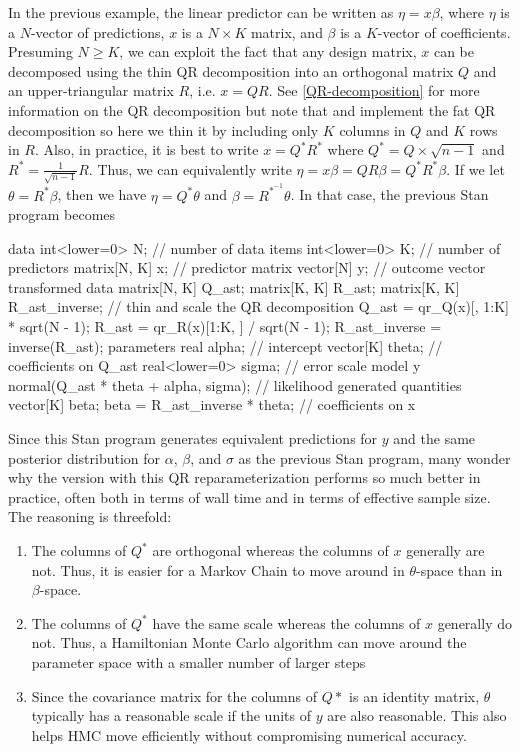 In the previous example, the linear predictor can be written as
$\eta = x \beta$, where $\eta$ is a $N$-vector of predictions, 
$x$ is a $N \times K$ matrix, and $\beta$ is a $K$-vector of coefficients.
Presuming $N \geq K$, we can exploit the fact that any design matrix, $x$
can be decomposed using the thin QR decomposition into an orthogonal matrix
$Q$ and an upper-triangular matrix $R$, i.e. $x = Q R$. See \ref{QR-decomposition}
for more information on the QR decomposition but note that  and 
 implement the fat QR decomposition so here we thin it by including
only $K$ columns in $Q$ and $K$ rows in $R$. Also, in practice, it is best to
write $x = Q^\ast R^\ast$ where $Q^\ast = Q \times \sqrt{n - 1}$ and 
$R^\ast = \frac{1}{\sqrt{n - 1}} R$. Thus, we can equivalently write 
$\eta = x \beta = Q R \beta = Q^\ast R^\ast \beta$. If we let 
$\theta = R^\ast \beta$, then we have $\eta = Q^\ast \theta$ and 
$\beta = R^{\ast^{-1}} \theta$. In that case, the previous Stan program becomes
%
\begin{stancode}
data {
  int<lower=0> N;   // number of data items
  int<lower=0> K;   // number of predictors
  matrix[N, K] x;   // predictor matrix
  vector[N] y;      // outcome vector
}
transformed data {
  matrix[N, K] Q_ast;
  matrix[K, K] R_ast;
  matrix[K, K] R_ast_inverse;
  // thin and scale the QR decomposition
  Q_ast = qr_Q(x)[, 1:K] * sqrt(N - 1);
  R_ast = qr_R(x)[1:K, ] / sqrt(N - 1);
  R_ast_inverse = inverse(R_ast);
}
parameters {
  real alpha;           // intercept
  vector[K] theta;      // coefficients on Q_ast
  real<lower=0> sigma;  // error scale
}
model {
  y ~ normal(Q_ast * theta + alpha, sigma);  // likelihood
}
generated quantities {
  vector[K] beta;
  beta = R_ast_inverse * theta; // coefficients on x
}
\end{stancode}
%
Since this Stan program generates equivalent predictions for $y$ and
the same posterior distribution for $\alpha$, $\beta$, and $\sigma$ as
the previous Stan program, many wonder why the version with this QR
reparameterization performs so much better in practice, often both in
terms of wall time and in terms of effective sample size. The
reasoning is threefold:
%
\begin{enumerate}
\item The columns of $Q^\ast$ are orthogonal whereas the columns of
  $x$ generally are not. Thus, it is easier for a Markov Chain to move
  around in $\theta$-space than in $\beta$-space.
\item The columns of $Q^\ast$ have the same scale whereas the columns
  of $x$ generally do not. Thus, a Hamiltonian Monte Carlo algorithm
  can move around the parameter space with a smaller number of larger
  steps
\item Since the covariance matrix for the columns of $Q\ast$ is an
  identity matrix, $\theta$ typically has a reasonable scale if the
  units of $y$ are also reasonable. This also helps HMC move
  efficiently without compromising numerical accuracy.
\end{enumerate}

